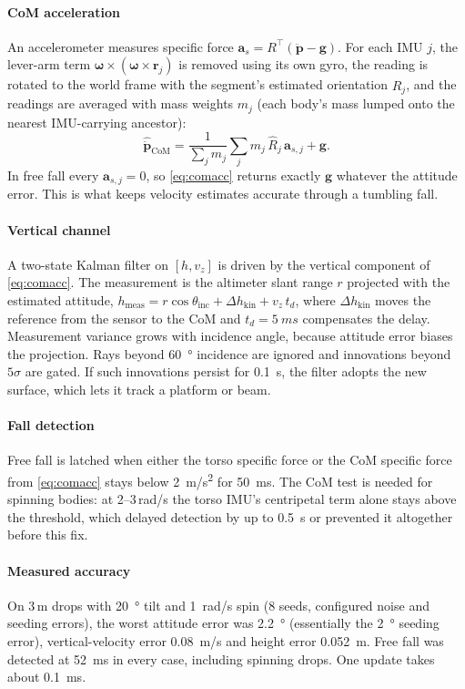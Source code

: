 \documentclass[conference]{IEEEtran}
\newcommand{\vect}[1]{\boldsymbol{#1}}
\begin{document}
\paragraph*{CoM acceleration} An accelerometer measures specific force $\vect a_s = R^{\top}(\ddot{\vect p}-\vect g)$. For each IMU $j$, the lever-arm term $\vect\omega\times(\vect\omega\times\vect r_j)$ is removed using its own gyro, the reading is rotated to the world frame with the segment's estimated orientation $\hat R_j$, and the readings are averaged with mass weights $m_j$ (each body's mass lumped onto the nearest IMU-carrying ancestor):
\begin{equation}
\hat{\ddot{\vect p}}_{\text{CoM}} = \frac{1}{\sum_j m_j}\sum_j m_j\,\hat R_j\,\vect a_{s,j} + \vect g .
\label{eq:comacc}
\end{equation}
In free fall every $\vect a_{s,j}=0$, so \eqref{eq:comacc} returns exactly $\vect g$ whatever the attitude error. This is what keeps velocity estimates accurate through a tumbling fall.

\paragraph*{Vertical channel} A two-state Kalman filter on $[h, v_z]$ is driven by the vertical component of \eqref{eq:comacc}. The measurement is the altimeter slant range $r$ projected with the estimated attitude, $h_{\text{meas}}=r\cos\theta_{\text{inc}}+\Delta h_{\text{kin}}+v_z\,t_d$, where $\Delta h_{\text{kin}}$ moves the reference from the sensor to the CoM and $t_d=\SI{5}{ms}$ compensates the delay. Measurement variance grows with incidence angle, because attitude error biases the projection. Rays beyond \SI{60}{\degree} incidence are ignored and innovations beyond $5\sigma$ are gated. If such innovations persist for \SI{0.1}{s}, the filter adopts the new surface, which lets it track a platform or beam.

\paragraph*{Fall detection} Free fall is latched when either the torso specific force or the CoM specific force from \eqref{eq:comacc} stays below \SI{2}{m/s^2} for \SI{50}{ms}. The CoM test is needed for spinning bodies: at 2--3\,\si{rad/s} the torso IMU's centripetal term alone stays above the threshold, which delayed detection by up to \SI{0.5}{s} or prevented it altogether before this fix.

\paragraph*{Measured accuracy} On 3\,m drops with \SI{20}{\degree} tilt and \SI{1}{rad/s} spin (8 seeds, configured noise and seeding errors), the worst attitude error was \SI{2.2}{\degree} (essentially the \SI{2}{\degree} seeding error), vertical-velocity error \SI{0.08}{m/s} and height error \SI{0.052}{m}. Free fall was detected at \SI{52}{ms} in every case, including spinning drops. One update takes about \SI{0.1}{ms}.
\end{document}
